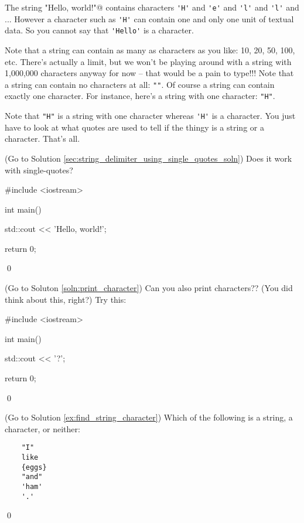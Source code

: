 \begin{console}[commandchars=\~\!\@]
The string \verb@"Hello, world!\n"@ contains characters 
\verb!'H'! and \verb!'e'! and \verb!'l'! and \verb!'l'! and 
... 
However a character such as 
\verb!'H'! can contain one and only one unit of textual data. 
So you cannot say that \verb!'Hello'! is a character. 

Note that a string can contain as many as characters as you like: 
10, 20, 50, 100, etc. 
There's actually a limit, but we won't be playing around with a string with 
1,000,000 characters anyway for now --
that would be a pain to type!!! 
Note that a string can contain no characters at all: 
\verb!""!. 
Of course a string can contain exactly one character. 
For instance, here's a string with one character: \verb!"H"!. 

Note that \verb!"H"! is a string with one character whereas 
\verb!'H'! is a character. 
You just have to look at what quotes are used to tell if the thingy is a 
string or a character. That's all.


\begin{ex} \label{sec:string_delimiter_using_single_quotes} 
(Go to Solution \ref{sec:string_delimiter_using_single_quotes_soln})
Does it work with single-quotes?
\begin{console}
#include <iostream>

int main()
{
    std::cout << 'Hello, world!\n';

    return 0;
}
\end{console}
\qed
\end{ex}


\begin{ex} \label{ex:print_character}
(Go to Soluton \ref{soln:print_character})
Can you also print characters?? (You did think about this, right?) Try this:
\begin{console}
#include <iostream>

int main()
{
    std::cout << '?';

    return 0;
}
\end{console}
\qed
\end{ex}


\begin{ex} \label{soln:find_string_character}
(Go to Solution \ref{ex:find_string_character})
Which of the following is a string, a character, or neither:
\begin{verbatim}
    "I"      
    like     
    {eggs}   
    "and"    
    'ham'    
    '.'      
\end{verbatim}
\qed
\end{ex}



\end{console}
